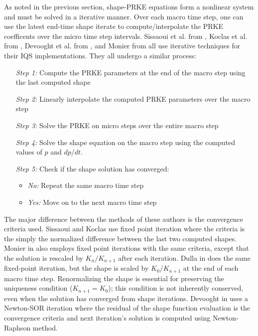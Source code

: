 \documentclass{elsarticle}
\begin{document}
As noted in the previous section, shape-PRKE equations form a nonlinear system and must be solved in a iterative manner.  Over each macro time step,  one can 
use the latest end-time shape iterate to compute/interpolate the PRKE coefficents over the micro time step intervals. 
Sissaoui et al. from \cite{Sissaoui_1995}, Koclas et al. from \cite{Koclas_1996}, Devooght et al. from \cite{Devooght_1984}, and Monier from \cite{Monier_diss} all use 
iterative techniques for their IQS implementations.  They all undergo a similar process:
\begin{adjustwidth*}{0cm}{4mm}
\begin{itemize}
\item[\textit{Step 1:}] Compute the PRKE parameters at the end of the macro step using the last computed shape
\item[\textit{Step 2:}] Linearly interpolate the computed PRKE parameters over the macro step
\item[\textit{Step 3:}] Solve the PRKE on micro steps over the entire macro step
\item[\textit{Step 4:}] Solve the shape equation on the macro step using the computed values of $p$ and $dp/dt$.
\item[\textit{Step 5:}] Check if the shape solution has converged:
	\begin{itemize}
	\item \textit{No:} Repeat the same macro time step
	\item \textit{Yes:} Move on to the next macro time step
	\end{itemize}
\end{itemize}
\end{adjustwidth*}

The major difference between the methods of these authors is the convergence criteria used.  Sissaoui and Koclas \cite{Sissaoui_1995, Koclas_1996} 
use fixed point iteration where the criteria is the simply the normalized difference between the last two computed shapes.  Monier in \cite{Monier_diss} 
also employs fixed point iterations with the same criteria, except that the solution is rescaled by $K_n/K_{n+1}$ after each iteration. Dulla in 
\cite{Dulla2008} does the same fixed-point iteration, but the shape is scaled by $K_0/K_{n+1}$ at the end of each macro time step. Renormalizing 
the shape is essential for preserving the uniqueness condition ($K_{n+1} = K_0$); this condition is not inherently conserved, even when the 
solution has converged from shape iterations. Devooght in \cite{Devooght_1984} uses a Newton-SOR iteration where the residual of the shape function 
evaluation is the convergence criteria and next iteration's 
solution is computed using Newton-Raphson method.
\end{document}
